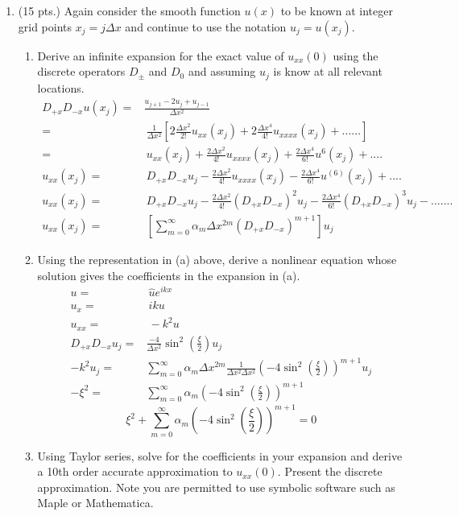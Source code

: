 \documentclass[11pt]{article}
\newcommand{\Dpx}{D_{+x}}
\newcommand{\Dmx}{D_{-x}}
\newcommand{\dx}{\Delta x}
\begin{document}
\begin{enumerate}
  \item(15 pts.) {\color{red}Again consider the smooth function }$u(x)$ {\color{red}to be known at integer grid points }$x_j=j\dx$ {\color{red}and continue to use the notation} $u_j=u(x_j)$.
  \begin{enumerate}
    \item {\color{blue}Derive an infinite expansion for the exact value of} $u_{xx}(0)${ \color{blue}using the discrete operators }$D_{\pm}$ {\color{blue}and} $D_0$ {\color{blue}and assuming} $u_j$ {\color{blue}is know at all relevant locations. }\\
    \begin{align*}
    \Dpx\Dmx u(x_j) = & \frac{u_{j+1}-2u_j + u_{j-1}}{\dx^2} \\
    = & \ \frac{1}{\dx^2}\left[2 \frac{\dx^2}{2!}u_{xx}(x_j) + 2\frac{\dx^4}{4!}u_{xxxx}(x_j) + ... ...\right] \\
    = & \ u_{xx}(x_j) + \frac{2\dx^2}{4!}u_{xxxx}(x_j) + \frac{2\dx^4}{6!}u^{6}(x_j) + .... \\
    u_{xx}(x_j) = & \ \Dpx\Dmx u_j - \frac{2\dx^2}{4!} u_{xxxx}(x_j) - \frac{2\dx^4}{6!} u^{(6)}(x_j) + .... \\
    u_{xx}(x_j) = & \ \Dpx\Dmx u_j - \frac{2\dx^2}{4!} \left(\Dpx\Dmx\right)^2u_j - \frac{2\dx^4}{6!}\left(\Dpx\Dmx\right)^3u_j - .... ... \\
    u_{xx}(x_j) = & \ \left[ \sum_{m=0}^{\infty} \alpha_m \dx^{2m} \left(\Dpx\Dmx\right)^{m+1}\right]u_j
    \end{align*}
    \item {\color{blue}Using the representation in (a) above, derive a nonlinear equation whose solution gives the coefficients in the expansion in (a). }\\
    \begin{align*}
    u = & \ \hat{u}e^{ikx} \\
    u_x =  & \ ik u \\
    u_{xx} = & \ -k^2u \\
    \Dpx\Dmx u_j = & \frac{-4}{\dx^2}\sin^2\left(\frac{\xi}{2}\right) u_j \\
    -k^2u_j = & \sum_{m=0}^{\infty} \alpha_m \dx^{2m} \frac{1}{\dx^2 \dx^2} \left(-4\sin^2\left(\frac{\xi}{2}\right)\right)^{m+1} u_j \\
    -\xi^2 = & \sum_{m=0}^{\infty} \alpha_m\left(-4\sin^2\left(\frac{\xi}{2}\right)\right)^{m+1}
    \end{align*}
    $$ \xi^2 + \sum_{m=0}^{\infty} \alpha_m\left(-4\sin^2\left(\frac{\xi}{2}\right)\right)^{m+1} = 0$$
    \item {\color{blue}Using Taylor series, solve for the coefficients in your expansion and derive a 10th order accurate approximation to }$u_{xx}(0)$.{ \color{blue}Present the discrete approximation. Note you are permitted to use symbolic software such as Maple or Mathematica.} \\
    

\end{enumerate}
\end{enumerate}
\end{document}
